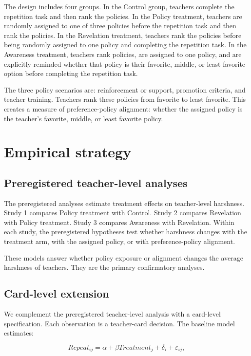 \documentclass[12pt,a4paper]{article}
\begin{document}
The design includes four groups. In the Control group, teachers complete the repetition task and then rank the policies. In the Policy treatment, teachers are randomly assigned to one of three policies before the repetition task and then rank the policies. In the Revelation treatment, teachers rank the policies before being randomly assigned to one policy and completing the repetition task. In the Awareness treatment, teachers rank policies, are assigned to one policy, and are explicitly reminded whether that policy is their favorite, middle, or least favorite option before completing the repetition task.

The three policy scenarios are: reinforcement or support, promotion criteria, and teacher training. Teachers rank these policies from favorite to least favorite. This creates a measure of preference-policy alignment: whether the assigned policy is the teacher's favorite, middle, or least favorite policy.

\section{Empirical strategy}

\subsection{Preregistered teacher-level analyses}

The preregistered analyses estimate treatment effects on teacher-level harshness. Study 1 compares Policy treatment with Control. Study 2 compares Revelation with Policy treatment. Study 3 compares Awareness with Revelation. Within each study, the preregistered hypotheses test whether harshness changes with the treatment arm, with the assigned policy, or with preference-policy alignment.

These models answer whether policy exposure or alignment changes the average harshness of teachers. They are the primary confirmatory analyses.

\subsection{Card-level extension}

We complement the preregistered teacher-level analysis with a card-level specification. Each observation is a teacher-card decision. The baseline model estimates:

\[
Repeat_{ij} = \alpha + \beta Treatment_j + \delta_i + \varepsilon_{ij},
\]
\end{document}
